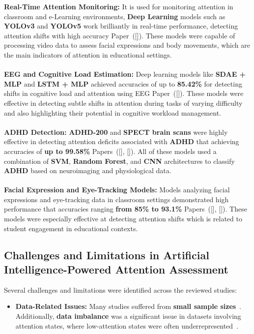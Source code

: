\documentclass[twocolumn,12pt]{article}
\begin{document}
{\textbullet \textbf{Real-Time Attention Monitoring:} It is used for monitoring attention in classroom and e-Learning environments, \textbf{Deep Learning} models such as \textbf{YOLOv3} and \textbf{YOLOv5} work brilliantly in real-time performance, detecting attention shifts with high accuracy Paper~([\citealp{ref8}]). These models were capable of processing video data to assess facial expressions and body movements, which are the main indicators of attention in educational settings. \\ \\ 
\textbullet \textbf{EEG and Cognitive Load Estimation:} Deep learning models like \textbf{SDAE + MLP} and \textbf{LSTM + MLP} achieved accuracies of up to \textbf{85.42\%} for detecting shifts in cognitive load and attention using EEG Paper~([\citealp{ref3}]). These models were effective in detecting subtle shifts in attention during tasks of varying difficulty and also highlighting their potential in cognitive workload management.  \\ \\
\textbullet \textbf{ADHD Detection:} \textbf{ADHD-200} and \textbf{SPECT brain scans} were highly effective in detecting attention deficits associated with \textbf{ADHD} that achieving accuracies of \textbf{up to 99.58\%} Papers~([\citealp{ref11}], [\citealp{ref19}]). All of these models used a combination of \textbf{SVM}, \textbf{Random Forest}, and \textbf{CNN} architectures to classify \textbf{ADHD} based on neuroimaging and physiological data.  \\ \\
\textbullet \textbf{Facial Expression and Eye-Tracking Models:} Models analyzing facial expressions and eye-tracking data in classroom settings demonstrated high performance that accuracies ranging \textbf{from 85\% to 93.1\%} Papers~([\citealp{ref7}], [\citealp{ref8}]). These models were especially effective at detecting attention shifts which is related to student engagement in educational contexts.  \\ 

\subsection{Challenges and Limitations in Artificial Intelligence-Powered Attention Assessment}

Several challenges and limitations were identified across the reviewed studies:

\begin{itemize}
    \item \textbf{Data-Related Issues:} Many studies suffered from \textbf{small sample sizes}~\citep{ref3,ref13}. Additionally, \textbf{data imbalance} was a significant issue in datasets involving attention states, where low-attention states were often underrepresented~\citep{ref9,ref19}.
    

\end{itemize}}
\end{document}
